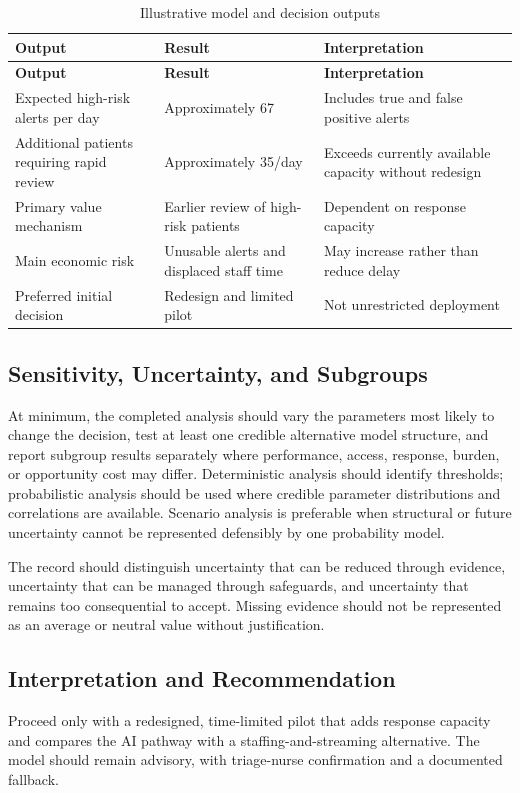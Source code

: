 \begin{longtable}{@{}p{}p{}p{}@{}}
\caption{Illustrative model and decision outputs}
\label{tab:comp-ch01-outputs}\\
\toprule
\textbf{Output} & \textbf{Result} & \textbf{Interpretation} \\
\midrule
\endfirsthead
\toprule
\textbf{Output} & \textbf{Result} & \textbf{Interpretation} \\
\midrule
\endhead
\bottomrule
\endlastfoot
Expected high-risk alerts per day & Approximately 67 & Includes true and false positive alerts \\
Additional patients requiring rapid review & Approximately 35/day & Exceeds currently available capacity without redesign \\
Primary value mechanism & Earlier review of high-risk patients & Dependent on response capacity \\
Main economic risk & Unusable alerts and displaced staff time & May increase rather than reduce delay \\
Preferred initial decision & Redesign and limited pilot & Not unrestricted deployment \\
\end{longtable}

\subsection{Sensitivity, Uncertainty, and Subgroups}
At minimum, the completed analysis should vary the parameters most likely to
change the decision, test at least one credible alternative model structure, and
report subgroup results separately where performance, access, response, burden,
or opportunity cost may differ. Deterministic analysis should identify thresholds;
probabilistic analysis should be used where credible parameter distributions and
correlations are available. Scenario analysis is preferable when structural or
future uncertainty cannot be represented defensibly by one probability model.

The record should distinguish uncertainty that can be reduced through evidence,
uncertainty that can be managed through safeguards, and uncertainty that remains
too consequential to accept. Missing evidence should not be represented as an
average or neutral value without justification.

\subsection{Interpretation and Recommendation}
Proceed only with a redesigned, time-limited pilot that adds response capacity and compares the AI pathway with a staffing-and-streaming alternative. The model should remain advisory, with triage-nurse confirmation and a documented fallback.

